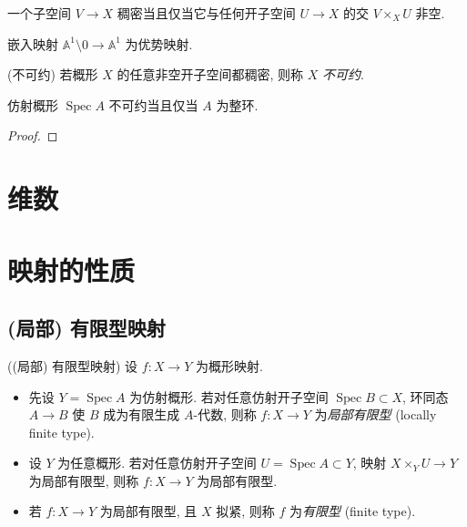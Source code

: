 \documentclass{book}
\newcommand{\todo}[1]{{\color{blue}\fbox{TODO: \textbf{#1}}}}
\begin{document}
	\begin{prop}
		{}
		一个子空间 $V\to X$ 稠密当且仅当它与任何开子空间 $U\to X$ 的交 $V\times_X U$ 非空.
	\end{prop}
	
	\todo{}
	
	\begin{example}
		{}
		嵌入映射 $\mathbb A^1\setminus 0 \to \mathbb A^1$ 为优势映射.
	\end{example}
	
	\begin{definition}
		{(不可约)}
		若概形 $X$ 的任意非空开子空间都稠密, 则称 $X$ \emph{不可约}.
	\end{definition}
	
	\begin{prop}
		{}
		仿射概形 $\operatorname{Spec} A$ 不可约当且仅当 $A$ 为整环.
	\end{prop}
	\begin{proof}
		
	\end{proof}
	
	\section{维数}
	
	
	
	\section{映射的性质}
	
	\subsection{(局部) 有限型映射}
	
	\begin{definition}
		[label={locally-finite-type-morphism}]
		{((局部) 有限型映射)}
		设 $f\colon X\to Y$ 为概形映射.
		\begin{itemize}
			\item 先设 $Y=\operatorname{Spec} A$ 为仿射概形. 若对任意仿射开子空间 $\operatorname{Spec} B\subset X$, 环同态 $A\to B$ 使 $B$ 成为有限生成 $A$-代数, 则称 $f\colon X\to Y$ 为\emph{局部有限型} (locally finite type).
			\item 设 $Y$ 为任意概形. 若对任意仿射开子空间 $U=\operatorname{Spec} A\subset Y$, 映射 $X\times_Y U \to Y$ 为局部有限型, 则称 $f\colon X\to Y$ 为局部有限型.
			\item 若 $f\colon X\to Y$ 为局部有限型, 且 $X$ 拟紧, 则称 $f$ 为\emph{有限型} (finite type).
		\end{itemize}
	\end{definition}
	
\end{document}

